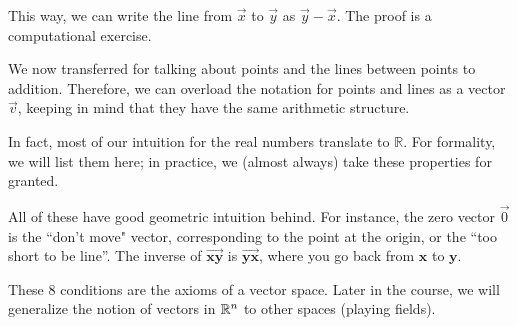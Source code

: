 This way, we can write the line from $\vec{x}$ to $\vec{y}$ as $\vec{y}-\vec{x}$. The proof is a computational exercise. \\ 
\begin{notation}
	We now transferred for talking about points and the lines between points to addition. Therefore, we can overload the notation for points and lines as a vector $\vec{v}$, keeping in mind that they have the same arithmetic structure.
\end{notation}


In fact, most of our intuition for the real numbers translate to $\mathbb{R}$. For formality, we will list them here; in practice, we (almost always) take these properties for granted.
\begin{remark}
	All of these have good geometric intuition behind. For instance, the zero vector $\vec{0}$ is the ``don't move" vector, corresponding to the point at the origin, or the ``too short to be line''. The inverse of $\overrightarrow{\mathbf{xy}}$ is $\overrightarrow{\mathbf{yx}}$, where you go back from $\mathbf{x}$ to $\mathbf{y}$. \begin{tikzpicture}
		
	\end{tikzpicture}
\end{remark}
\begin{remark}
	These $8$ conditions are the axioms of a vector space. Later in the course, we will generalize the notion of vectors in $\reals^n$ to other spaces (playing fields).
\end{remark}
